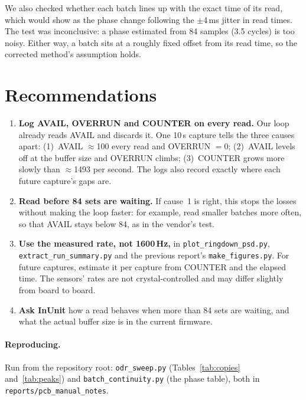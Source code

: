 \documentclass[11pt]{article}
\newcommand{\code}[1]{\texttt{#1}}
\begin{document}
We also checked whether each batch lines up with the exact time of its
read, which would show as the phase change following the $\pm$4\,ms jitter
in read times. The test was inconclusive: a phase estimated from 84 samples
(3.5 cycles) is too noisy. Either way, a batch sits at a roughly fixed
offset from its read time, so the corrected method's assumption holds.

\section{Recommendations}

\begin{enumerate}
  \item \textbf{Log AVAIL, OVERRUN and COUNTER on every read.} Our loop
        already reads AVAIL and discards it. One 10\,s capture tells the
        three causes apart: (1)~AVAIL $\approx$100 every read and OVERRUN
        $=0$; (2)~AVAIL levels off at the buffer size and OVERRUN climbs;
        (3)~COUNTER grows more slowly than $\approx$1493 per second. The
        logs also record exactly where each future capture's gaps are.
  \item \textbf{Read before 84 sets are waiting.} If cause~1 is right, this
        stops the losses without making the loop faster: for example, read
        smaller batches more often, so that AVAIL stays below 84, as in the
        vendor's test.
  \item \textbf{Use the measured rate, not 1600\,Hz,} in
        \code{plot\_ringdown\_psd.py}, \code{extract\_run\_summary.py} and the
        previous report's \code{make\_figures.py}. For future captures,
        estimate it per capture from COUNTER and the elapsed time. The
        sensors' rates are not crystal-controlled and may differ slightly
        from board to board.
  \item \textbf{Ask InUnit} how a read behaves when more than 84 sets are
        waiting, and what the actual buffer size is in the current firmware.
\end{enumerate}

\paragraph{Reproducing.} Run from the repository root:
\code{odr\_sweep.py} (Tables~\ref{tab:copies} and~\ref{tab:peaks}) and
\code{batch\_continuity.py} (the phase table), both in
\code{reports/pcb\_manual\_notes}.
\end{document}
